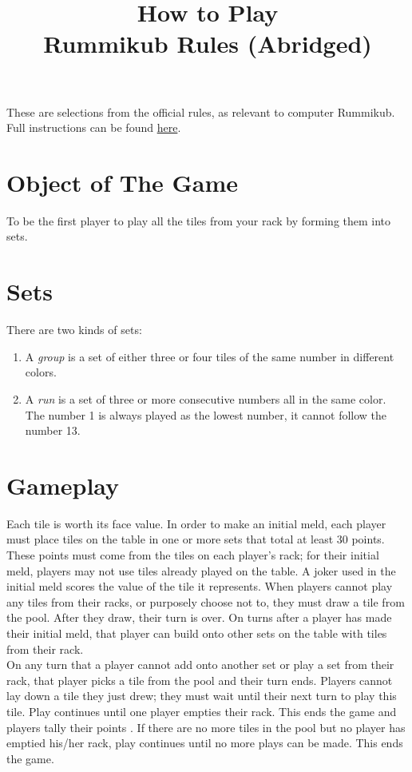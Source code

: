 \documentclass[a4paper,10pt]{article}
\title{%
    \textbf{How to Play} \\
    \large Rummikub Rules (Abridged)}
\date{}
\author{}
\begin{document}
\maketitle
These are selections from the official rules, as relevant to computer Rummikub.
Full instructions can be found \href{https://rummikub.com/rules/}{here}.

\section{Object of The Game}
To be the ﬁrst player to play all the tiles from your rack by forming them into sets.

\section{Sets}\label{sets}
There are two kinds of sets:
\begin{enumerate}
 \item A \emph{group} is a set of either three or four tiles of the same number in different colors.
 \item A \emph{run} is a set of three or more consecutive numbers all in the same color. The number 1 is always played as the lowest number, it cannot follow the number 13.
\end{enumerate}

\section{Gameplay}
Each tile is worth its face value. In order to make an initial meld, each player must place tiles on the table in one or more sets that total at least 30 points. These points must come from the tiles on each player’s rack; for their initial meld, players may not use tiles already played on the table. A joker used in the initial meld scores the value of the tile it represents. When players cannot play any tiles from their racks, or purposely choose not to, they must draw a tile from the pool. After they draw, their turn is over. On turns after a player has made their initial meld, that player can build onto other sets on the table with tiles from their rack.\\
On any turn that a player cannot add onto another set or play a set from their rack, that player picks a tile from the pool and their turn ends. Players cannot lay down a tile they just drew; they must wait until their next turn to play this tile. Play continues until one player empties their rack. This ends the game and players tally their points
. If there are no more tiles in the pool but no player has emptied his/her rack, play continues until no more plays can be made. This ends the game.
\end{document}
